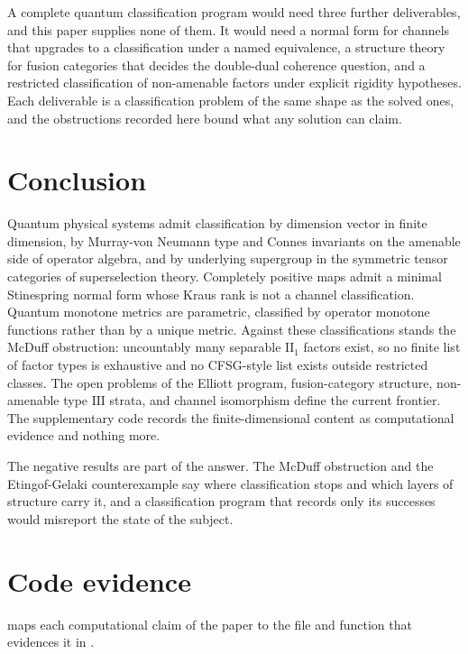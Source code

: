 \documentclass[11pt,letterpaper]{article}
\theoremstyle{definition}
\theoremstyle{remark}
\begin{document}
A complete quantum classification program would need three further deliverables, and this paper supplies none of them. It would need a normal form for channels that upgrades to a classification under a named equivalence, a structure theory for fusion categories that decides the double-dual coherence question, and a restricted classification of non-amenable factors under explicit rigidity hypotheses. Each deliverable is a classification problem of the same shape as the solved ones, and the obstructions recorded here bound what any solution can claim.

\section{Conclusion}

Quantum physical systems admit classification by dimension vector in finite dimension, by Murray-von Neumann type and Connes invariants on the amenable side of operator algebra, and by underlying supergroup in the symmetric tensor categories of superselection theory. Completely positive maps admit a minimal Stinespring normal form whose Kraus rank is not a channel classification. Quantum monotone metrics are parametric, classified by operator monotone functions rather than by a unique metric. Against these classifications stands the McDuff obstruction: uncountably many separable $\mathrm{II}_1$ factors exist, so no finite list of factor types is exhaustive and no CFSG-style list exists outside restricted classes. The open problems of the Elliott program, fusion-category structure, non-amenable type $\mathrm{III}$ strata, and channel isomorphism define the current frontier. The supplementary code records the finite-dimensional content as computational evidence and nothing more.

The negative results are part of the answer. The McDuff obstruction and the Etingof-Gelaki counterexample say where classification stops and which layers of structure carry it, and a classification program that records only its successes would misreport the state of the subject.

\appendix
\section{Code evidence}
\label{app:code}

 maps each computational claim of the paper to the file and function that evidences it in .
\end{document}
